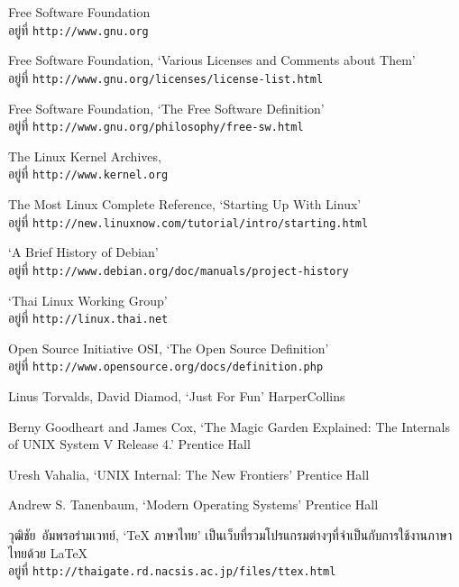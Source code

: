 \begin{thwbr}
\begin{thebibliography}{99}

 Free Software Foundation\\
	อยู่ที่ \texttt{http://www.gnu.org}

 Free Software Foundation, \newblock `Various Licenses and Comments about Them'\\
	อยู่ที่ \texttt{http://www.gnu.org/licenses/license-list.html}

 Free Software Foundation, \newblock `The Free Software Definition'\\
	อยู่ที่ \texttt{http://www.gnu.org/philosophy/free-sw.html}

 The Linux Kernel Archives, \\
	อยู่ที่ \texttt{http://www.kernel.org}

 The Most Linux Complete Reference, \newblock `Starting Up With Linux'\\
	อยู่ที่ \texttt{http://new.linuxnow.com/tutorial/intro/starting.html}

 `A Brief History of Debian'\\
	อยู่ที่ \texttt{http://www.debian.org/doc/manuals/project-history}

 `Thai Linux Working Group'\\
	อยู่ที่ \texttt{http://linux.thai.net}

 Open Source Initiative OSI, \newblock `The Open Source Definition'\\
	อยู่ที่ \texttt{http://www.opensource.org/docs/definition.php}

 Linus Torvalds, David Diamod, \newblock `Just For Fun' \newblock HarperCollins 

 Berny Goodheart and James Cox, \newblock `The Magic Garden Explained: The Internals of UNIX System V Release 4.' \newblock Prentice Hall 

 Uresh Vahalia, \newblock `UNIX Internal: The New Frontiers' \newblock Prentice Hall 

 Andrew S. Tanenbaum, \newblock `Modern Operating Systems' \newblock Prentice Hall 

 วุฒิชัย~อัมพรอร่ามเวทย์, \newblock `\TeX{} ภาษาไทย'
    \newblock เป็นเว็บที่รวมโปรแกรมต่างๆที่จำเป็นกับการใช้งานภาษาไทยด้วย 
    \LaTeX{}\\ 
    อยู่ที่ \texttt{http://thaigate.rd.nacsis.ac.jp/files/ttex.html}



\end{thebibliography}
\end{thwbr}
